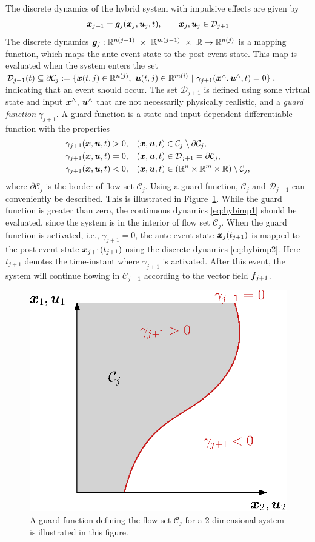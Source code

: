 \documentclass[../DC2017114Bouma.tex]{subfiles}
\begin{document}
The discrete dynamics of the hybrid system with impulsive effects are given by
\begin{align}
{\boldsymbol{x}}_{j+1} = {\boldsymbol{g}}_j({\boldsymbol{x}}_j,{\boldsymbol{u}}_j,t), \qquad{\boldsymbol{x}}_j,{\boldsymbol{u}}_j\in \mathcal{D}_{j+1}\label{eq:hybimp2}
\end{align}
The discrete dynamics $\gb_j:\Rbb^{n(j-1)}\ \times\ \Rbb^{m(j-1)}\ \times\ \Rbb\rightarrow \Rbb^{n(j)}$ is a mapping function, which maps the ante-event state to the post-event state. This map is evaluated when the system enters the set $\mathcal{D}_{j+1}(t) \subseteq \partial \mathcal{C}_j := \{\xb(t,j)\in\Rbb^{n(j)},\ \ub(t,j)\in\Rbb^{m(i)}\ |\ \gamma_{j+1}(\xb^{\wedge},\ub^{\wedge},t) = 0\}$, indicating that an event should occur.  The set $\mathcal{D}_{j+1}$ is defined using some virtual state and input ${\boldsymbol{x}}^{\wedge}$, ${\boldsymbol{u}}^{\wedge}$ that are not necessarily physically realistic, and a \textit{guard function} $\gamma_{j+1}$. A guard function is a state-and-input dependent differentiable function with the properties
\begin{align}
&\gamma_{j+1}({\boldsymbol{x}},{\boldsymbol{u}},t) > 0,	&({\boldsymbol{x}},{\boldsymbol{u}},t) &\in \mathcal{C}_j\setminus\partial \mathcal{C}_j,\\
&\gamma_{j+1}({\boldsymbol{x}},{\boldsymbol{u}},t) = 0,	&({\boldsymbol{x}},{\boldsymbol{u}},t) &\in \mathcal{D}_{j+1} = \partial \mathcal{C}_j,\\
&\gamma_{j+1}({\boldsymbol{x}},{\boldsymbol{u}},t) < 0,	&({\boldsymbol{x}},{\boldsymbol{u}},t) &\in (\mathbb{R}^n \times \mathbb{R}^m \times \mathbb{R})\setminus \mathcal{C}_j,
\end{align}
where $\partial \mathcal{C}_j$ is the border of flow set $\mathcal{C}_j$. Using a guard function, $\mathcal{C}_j$ and $\mathcal{D}_{j+1}$ can conveniently be described. This is illustrated in Figure~\ref{fig:2guards}. While the guard function is greater than zero, the continuous dynamics \eqref{eq:hybimp1} should be evaluated, since the system is in the interior of flow set $\mathcal{C}_j$. When the guard function is activated, i.e., $\gamma_{j+1} = 0$, the ante-event state ${\boldsymbol{x}}_j(t_{j+1})$ is mapped to the post-event state ${\boldsymbol{x}}_{j+1}(t_{j+1})$ using the discrete dynamics \eqref{eq:hybimp2}. Here $t_{j+1}$ denotes the time-instant where $\gamma_{j+1}$ is activated. After this event, the system will continue flowing in $\mathcal{C}_{j+1}$ according to the vector field ${\boldsymbol{f}}_{j+1}$.

\begin{figure}[h]
\centering
\includegraphics[width=.4\textwidth]{guards.eps}\caption{A guard function defining the flow set $\mathcal{C}_j$ for a 2-dimensional system is illustrated in this figure.} \label{fig:2guards}
\end{figure}
\end{document}
